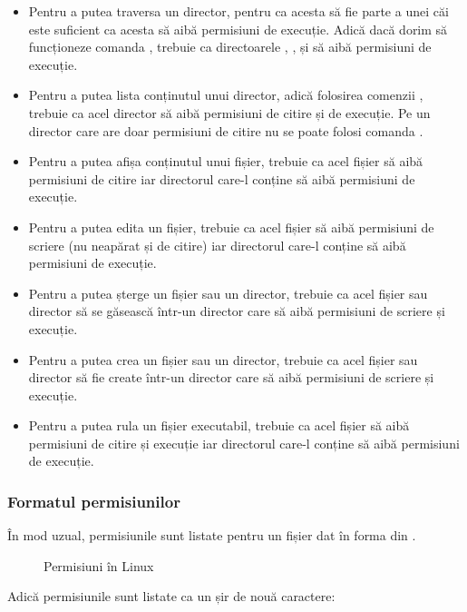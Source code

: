 \begin{itemize}
  \item Pentru a putea traversa un director, pentru ca acesta să fie parte a unei căi este suficient ca acesta să aibă permisiuni de execuție.
    Adică dacă dorim să funcționeze comanda , trebuie ca directoarele , ,  și  să aibă permisiuni de execuție.
  \item Pentru a putea lista conținutul unui director, adică folosirea comenzii , trebuie ca acel director să aibă permisiuni de citire și de execuție.
    Pe un director care are doar permisiuni de citire nu se poate folosi comanda .
  \item Pentru a putea afișa conținutul unui fișier, trebuie ca acel fișier să aibă permisiuni de citire iar directorul care-l conține să aibă permisiuni de execuție.
  \item Pentru a putea edita un fișier, trebuie ca acel fișier să aibă permisiuni de scriere (nu neapărat și de citire) iar directorul care-l conține să aibă permisiuni de execuție.
  \item Pentru a putea șterge un fișier sau un director, trebuie ca acel fișier sau director să se găsească într-un director care să aibă permisiuni de scriere și execuție.
  \item Pentru a putea crea un fișier sau un director, trebuie ca acel fișier sau director să fie create într-un director care să aibă permisiuni de scriere și execuție.
  \item Pentru a putea rula un fișier executabil, trebuie ca acel fișier să aibă permisiuni de citire și execuție iar directorul care-l conține să aibă permisiuni de execuție.
\end{itemize}

\subsubsection{Formatul permisiunilor}
\label{sec:user:perm-format}

În mod uzual, permisiunile sunt listate pentru un fișier dat în forma din .

\begin{figure}[htbp]
  \centering
  \def\svgwidth{0.7\columnwidth}
  
  \caption{Permisiuni în Linux}
  \label{fig:user:octal-perm}
\end{figure}

Adică permisiunile sunt listate ca un șir de nouă caractere:


